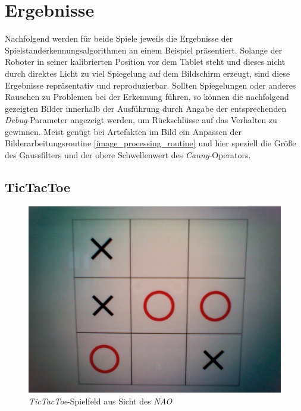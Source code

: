 \section{Ergebnisse}

Nachfolgend werden für beide Spiele jeweils die Ergebnisse der Spielstanderkennungsalgorithmen an einem Beispiel präsentiert. Solange der Roboter in seiner kalibrierten Position vor dem Tablet steht und dieses nicht durch direktes Licht zu viel Spiegelung auf dem Bildschirm erzeugt, sind diese Ergebnisse repräsentativ und reproduzierbar. Sollten Spiegelungen oder anderes Rauschen zu Problemen bei der Erkennung führen, so können die nachfolgend gezeigten Bilder innerhalb der Ausführung durch Angabe der entsprechenden \textit{Debug}-Parameter angezeigt werden, um Rückschlüsse auf das Verhalten zu gewinnen. Meist genügt bei Artefakten im Bild ein Anpassen der Bilderarbeitungsroutine \vref{image_processing_routine} und hier speziell die Größe des Gaussfilters und der obere Schwellenwert des \textit{Canny}-Operators.

\subsection{TicTacToe}

\begin{figure}[!htbp]
    \centering
    \includegraphics[width=12cm]{bilder/tictactoe_raw.png}
    \caption{\textit{TicTacToe}-Spielfeld aus Sicht des \textit{NAO}}
    \label{fig:tictactoe_raw}
\end{figure}

